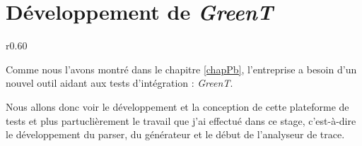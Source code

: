\chapter{Développement de \textit{\textit{GreenT}}}\label{chapGreent}
\begin{wrapfigure}{r}{0.60\textwidth}
\vspace{-25px}
\hspace{-30px}
\begin{minipage}{0.67\textwidth}
\minitoc
\end{minipage}
\end{wrapfigure}

Comme nous l'avons montré dans le chapitre \ref{chapPb}, l'entreprise a besoin d'un nouvel outil aidant aux tests d'intégration : \textit{GreenT}. 

Nous allons donc voir le développement et la conception de cette plateforme de tests et plus partuclièrement le travail que j'ai effectué dans ce stage, c'est-à-dire le développement du parser, du générateur et le début de l'analyseur de trace.

	
	
	
	